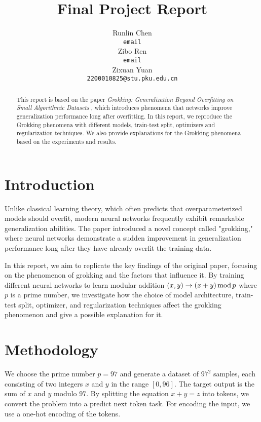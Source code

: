 \documentclass{article}
\title{Final Project Report}
\author{
    Runlin Chen \\
    \texttt{email} \\
    \And
    Zibo Ren \\
    \texttt{email} \\
    \And
    Zixuan Yuan \\
    \texttt{2200010825@stu.pku.edu.cn} \\
}
\begin{document}
\maketitle

\begin{abstract}
    This report is based on the paper \textit{Grokking: Generalization Beyond Overfitting on Small Algorithmic Datasets} \cite{power2022grokking}, which introduces phenomena that networks improve generalization performance long after overfitting. In this report, we reproduce the Grokking phenomena with different models, train-test split, optimizers and regularization techniques. We also provide explanations for the Grokking phenomena based on the experiments and results.
\end{abstract}

\section{Introduction}

Unlike classical learning theory, which often predicts that overparameterized models should overfit, modern neural networks frequently exhibit remarkable generalization abilities. The paper introduced a novel concept called "grokking," where neural networks demonstrate a sudden improvement in generalization performance long after they have already overfit the training data.

In this report, we aim to replicate the key findings of the original paper, focusing on the phenomenon of grokking and the factors that influence it. By training different neural networks to learn modular addition $(x, y) \rightarrow (x + y)\, {\rm mod}\, p$ where $p$ is a prime number, we investigate how the choice of model architecture, train-test split, optimizer, and regularization techniques affect the grokking phenomenon and give a possible explanation for it.

\section{Methodology}

We choose the prime number $p=97$ and generate a dataset of $97^2$ samples, each consisting of two integers $x$ and $y$ in the range $[0, 96]$. The target output is the sum of $x$ and $y$ modulo $97$. By splitting the equation $x + y = z$ into tokens, we convert the problem into a predict next token task. For encoding the input, we use a one-hot encoding of the tokens.
\end{document}
